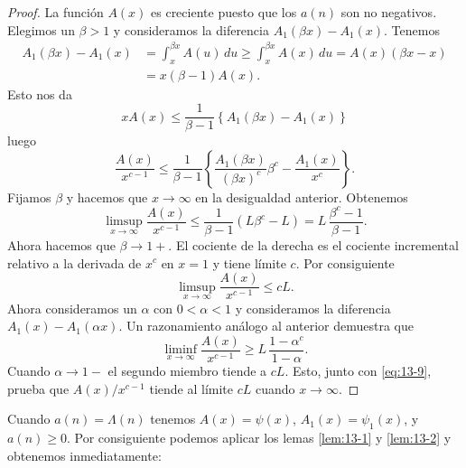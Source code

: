 \documentclass[12pt,a4paper]{book}
\begin{document}
    \begin{proof}
        La función $A(x)$ es creciente puesto que los $a(n)$ son no negativos. Elegimos un
        $\beta>1$ y consideramos la diferencia $A_{1}(\beta x)-A_{1}(x)$. Tenemos
        \begin{align*}
            A_{1}(\beta x)-A_{1}(x)&=\int_{x}^{\beta x}A(u)\,du\geq\int_{x}^{\beta x}A(x)\,du=A(x)(\beta x-x)\\
            &=x(\beta-1)A(x).
        \end{align*}
        Esto nos da
        \begin{equation*}
            xA(x)\leq\frac{1}{\beta-1}\left\{A_{1}(\beta x)-A_{1}(x)\right\}
        \end{equation*}
        luego
        \begin{equation*}
            \frac{A(x)}{x^{c-1}}\leq\frac{1}{\beta-1}\left\{\frac{A_{1}(\beta x)}{(\beta x)^{c}}\beta^{c}-\frac{A_{1}(x)}{x^{c}}\right\}.
        \end{equation*}
        Fijamos $\beta$ y hacemos que $x\to\infty$ en la desigualdad anterior. Obtenemos
        \begin{equation*}
            \limsup_{x\to\infty}\frac{A(x)}{x^{c-1}}\leq\frac{1}{\beta-1}(L\beta^{c}-L)=L\,\frac{\beta^{c}-1}{\beta-1}.
        \end{equation*}
        Ahora hacemos que $\beta\to1+$. El cociente de la derecha es el cociente incremental
        relativo a la derivada de $x^{c}$ en $x=1$ y tiene límite $c$. Por consiguiente
        \begin{equation}\label{eq:13-9}
            \limsup_{x\to\infty}\frac{A(x)}{x^{c-1}}\leq cL.
        \end{equation}
        Ahora consideramos un $\alpha$ con $0<\alpha<1$ y consideramos la diferencia
        $A_{1}(x)-A_{1}(\alpha x)$. Un razonamiento análogo al anterior demuestra que
        \begin{equation*}
            \liminf_{x\to\infty}\frac{A(x)}{x^{c-1}}\geq L\,\frac{1-\alpha^{c}}{1-\alpha}.
        \end{equation*}
        Cuando $\alpha\to1-$ el segundo miembro tiende a $cL$. Esto, junto con
        \eqref{eq:13-9}, prueba que $A(x)/x^{c-1}$ tiende al límite $cL$ cuando
        $x\to\infty$.
    \end{proof}

    Cuando $a(n)=\Lambda(n)$ tenemos $A(x)=\psi(x)$, $A_{1}(x)=\psi_{1}(x)$, y $a(n)\geq0$. Por
    consiguiente podemos aplicar los lemas \ref{lem:13-1} y \ref{lem:13-2} y obtenemos
    inmediatamente:
\end{document}
